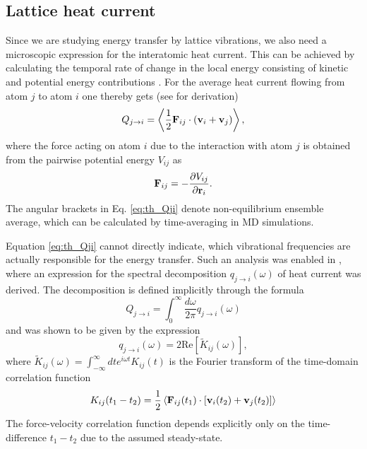 \subsection{Lattice heat current}

Since we are studying energy transfer by lattice vibrations, we also need a microscopic expression for the interatomic heat current. This can be achieved by calculating the temporal rate of change in the local energy consisting of kinetic and potential energy contributions \cite{hardy63,lepri03}. For the average heat current flowing from atom $j$ to atom $i$ one thereby gets (see  for derivation) 
\begin{equation}
 Q_{j\to i} = \left\langle \frac{1}{2} \mathbf{F}_{ij} \cdot \left( \mathbf{v}_i+\mathbf{v}_j \right) \right\rangle, \label{eq:th_Qji}
\end{equation}
where the force acting on atom $i$ due to the interaction with atom $j$ is obtained from the pairwise potential energy $V_{ij}$ as
\begin{equation}
 \mathbf{F}_{ij} = - \frac{\partial V_{ij}}{\partial \mathbf{r}_i}.
\end{equation}
The angular brackets in Eq. \eqref{eq:th_Qji} denote non-equilibrium ensemble average, which can be calculated by time-averaging in MD simulations. 

Equation \eqref{eq:th_Qji} cannot directly indicate, which vibrational frequencies are actually responsible for the energy transfer. Such an analysis was enabled in , where an expression for the spectral decomposition $q_{j\to i}(\omega)$ of heat current was derived. The decomposition is defined implicitly through the formula
\begin{equation}
 Q_{j\to i} = \int_0^{\infty} \frac{d\omega}{2\pi} q_{j\to i}(\omega)
\end{equation}
and was shown to be given by the expression
\begin{equation}
 q_{j \to i}(\omega) = 2\textrm{Re} [\tilde K_{ij}(\omega)],
\end{equation}
where $\tilde K_{ij}(\omega)=\int_{-\infty}^{\infty} dt e^{i\omega t}K_{ij}(t)$ is the Fourier transform of the time-domain correlation function
\begin{equation}
 K_{ij}(t_1-t_2) = \frac{1}{2} \left\langle \mathbf{F}_{ij}(t_1) \cdot \left[ \mathbf{v}_i(t_2)+\mathbf{v}_j(t_2)\right] \right\rangle \label{eq:th_Kijt1t2}
\end{equation}
The force-velocity correlation function depends explicitly only on the time-difference $t_1-t_2$ due to the assumed steady-state. 

